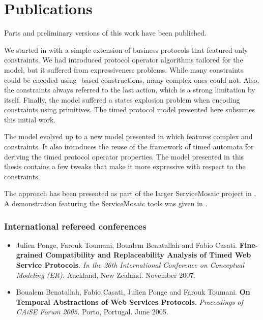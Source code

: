
\section{Publications}


Parts and preliminary versions of this work have been published.

We started in \cite{BCPT05a,BBFC+05b} with a simple extension of business protocols that featured only \MInvoke constraints. We had introduced protocol operator algorithms tailored for the model, but it suffered from  expressiveness problems. While many \CInvoke constraints could be encoded using \MInvoke-based constructions, many complex ones could not. Also, the \MInvoke constraints always referred to the last action, which is a strong limitation by itself. Finally, the model suffered a states explosion problem when encoding \CInvoke constraints using \MInvoke primitives. The timed protocol model presented here subsumes this initial work.

The model evolved up to a new model presented in \cite{PongeBCT07} which features complex \CInvoke and \MInvoke constraints. It also introduces the reuse of the framework of timed automata for deriving the timed protocol operator properties. The model presented in this thesis contains a few tweaks that make it more expressive with respect to the \MInvoke constraints.

The approach has been presented as part of the larger ServiceMosaic project in \cite{BCTPM06-SM}. A demonstration featuring the ServiceMosaic tools was given in \cite{NezhadSBCPT07}.

\subsubsection{International refereed conferences}
\begin{itemize}

	\item Julien Ponge, Farouk Toumani, Boualem Benatallah and Fabio Casati. \textbf{Fine-grained Compatibility and Replaceability Analysis of Timed Web Service Protocols}. \emph{In the 26th International Conference on Conceptual Modeling (ER).} Auckland, New Zealand. November 2007.
	
	\item Boualem Benatallah, Fabio Casati, Julien Ponge and Farouk Toumani. \textbf{On Temporal Abstractions of Web Services Protocols}. \emph{Proceedings of CAiSE Forum 2005.} Porto, Portugal. June 2005.

\end{itemize}

